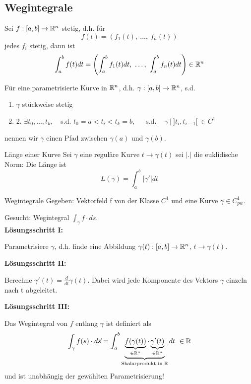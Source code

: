 \subsection{Wegintegrale}

Sei $f: [a, b] \rightarrow \mathbb{R}^{n}$ stetig, d.h. für
\[ f(t) = (f_1(t), ~ \ldots, ~ f_n(t)) \]
jedes $f_i$ stetig, dann ist
\[ \int_a^b f(t) dt = \left( \int_a^b f_1(t) dt, ~ \ldots , ~ \int_a^b f_n(t) dt\right) \in \mathbb{R}^n \]

Für eine parametrisierte Kurve in $\mathbb{R}^n$, d.h.
$\gamma : [a, b] \rightarrow \mathbb{R}^n$, s.d.
\begin{enumerate}
\item{ $\gamma$ stückweise stetig}
\item{2. $\exists t_0, \ldots, t_k$, ~ s.d. $t_0 = a < t_i < t_k = b$, ~~ s.d. ~
$\gamma ~ | ~ ]t_i, t_{i-1}[ ~ \in C^1$}
\end{enumerate}
nennen wir $\gamma$ einen Pfad zwischen
$\gamma(a)$ und $\gamma(b)$. 

\begin{Satz}{Länge einer Kurve}{}
	Sei $\gamma$ eine reguläre Kurve $t \to \gamma(t)$ sei $|.|$ die euklidische Norm: Die Länge ist
	\[
  		L(\gamma) = \int_a^b |\gamma'| dt
  	\]
\end{Satz}

\begin{Rezept}{Wegintegrale}{}
	Gegeben: Vektorfeld f von der Klasse $C^1$ und eine Kurve $\gamma \in C^1_{pw}$.
	
	Gesucht: Wegintegral $\int_\gamma f \cdot ds$.\\
	
	\textbf{Lösungsschritt I:}
	
	Parametrisiere $\gamma$, d.h. finde eine Abbildung $\gamma(t) : [a, b] \to \mathbb{R}^n$, $t \to \gamma(t)$.
	
	\textbf{Lösungsschritt II:}
	
	Berechne $\gamma'(t) = \frac{d}{dt} \gamma(t)$. Dabei wird jede Komponente des Vektors $\gamma$ einzeln nach t abgeleitet.
	
	\textbf{Lösungsschritt III:}
	
	Das Wegintegral von $f$ entlang $\gamma$ ist definiert als
	\[
		\int_{\gamma} f(s)\cdot d\vec{s} = 
		\int_a^b \underbrace{\underbrace{f(\gamma(t))}_{\in\mathbb{R}^n}  \cdot 
		\underbrace{\gamma'(t)}_{\in\mathbb{R}^n}}_{\text{Skalarprodukt in } \mathbb{R}} dt  ~
		\in \mathbb{R}
	\]
	und ist unabhängig der gewählten Parametrisierung!
\end{Rezept}


